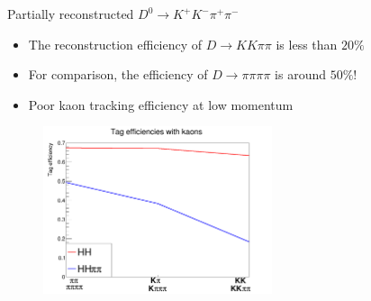 \documentclass{beamer}
\begin{document}
\begin{frame}{Partially reconstructed $D^0\to K^+K^-\pi^+\pi^-$}
  \begin{itemize}
    \item{The reconstruction efficiency of $D\to KK\pi\pi$ is less than $20\%$}
    \item{For comparison, the efficiency of $D\to\pi\pi\pi\pi$ is around $50\%$!}
    \item{Poor kaon tracking efficiency at low momentum}
  \end{itemize}
  \begin{figure}
    \includegraphics[width=0.6\textwidth]{Plots/KaonTrackingEfficiency.png}
  \end{figure}
\end{frame}
\end{document}
